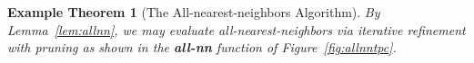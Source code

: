 \documentclass{article}
\newtheorem{lemma}{Lemma}
\newtheorem{example} {Example}
\newtheorem{exampletheorem} {Example Theorem}
\newcommand{\killspace}{\vspace{-0.08in}}
\newcommand{\GNP}[1][\psi]{{#1}_{\Theta}}
\newcommand{\sigmahat}{\mathbin{\widehat{\sigma}}}
\newcommand{\otimeshat}{\mathbin{\widehat{\otimes}}}
\newcommand{\odothat}{\mathbin{\widehat{\odot}}}
\newcommand{\disthrectmin}{d^{l}}
\newcommand{\disthrectmax}{d^{u}}
\begin{document}
\killspace
\begin{exampletheorem}[The All-nearest-neighbors Algorithm]
  By Lemma~\ref{lem:allnn}, we may evaluate all-nearest-neighbors via
  iterative refinement with pruning as shown in the {\bf all-nn}
  function of Figure~\ref{fig:allnntpc}.
\end{exampletheorem}
\killspace
% 
\end{document}
